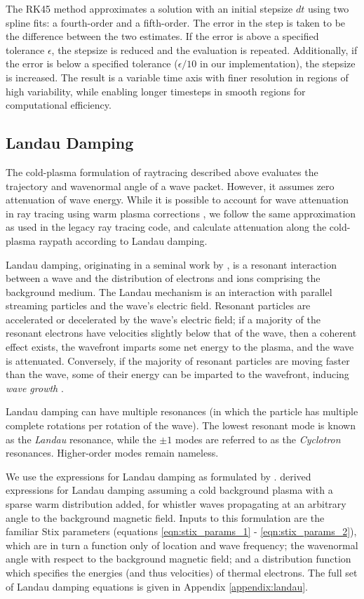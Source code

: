 The RK45 method approximates a solution with an initial stepsize $dt$ using two spline fits: a fourth-order and a fifth-order. The error in the step is taken to be the difference between the two estimates. If the error is above a specified tolerance $\epsilon$, the stepsize is reduced and the evaluation is repeated. Additionally, if the error is below a specified tolerance ($\epsilon/10$ in our implementation), the stepsize is increased. The result is a variable time axis with finer resolution in regions of high variability, while enabling longer timesteps in smooth regions for computational efficiency.

\subsection{Landau Damping}
\label{section:damping}
The cold-plasma formulation of raytracing described above evaluates the trajectory and wavenormal angle of a wave packet. However, it assumes zero attenuation of wave energy. While it is possible to account for wave attenuation in ray tracing using warm plasma corrections \citep{Sazhin1993, Henyey1980}, we follow the same approximation as used in the legacy ray tracing code, and calculate attenuation along the cold-plasma raypath according to Landau damping.

Landau damping, originating in a seminal work by \cite{Landau1946}, is a resonant interaction between a wave and the distribution of electrons and ions comprising the background medium. The Landau mechanism is an interaction with parallel streaming particles and the wave's electric field. Resonant particles are accelerated or decelerated by the wave's electric field; if a majority of the resonant electrons have velocities slightly below that of the wave, then a coherent effect exists, the wavefront imparts some net energy to the plasma, and the wave is attenuated. Conversely, if the majority of resonant particles are moving faster than the wave, some of their energy can be imparted to the wavefront, inducing \emph{wave growth} \citep{Chen1983, Kulkarni2009}. 

Landau damping can have multiple resonances (in which the particle has multiple complete rotations per rotation of the wave). The lowest resonant mode is known as the \emph{Landau} resonance, while the $\pm 1$ modes are referred to as the \emph{Cyclotron} resonances. Higher-order modes remain nameless.

We use the expressions for Landau damping as formulated by \cite{Brinca1972}. \citeauthor{Brinca1972} derived expressions for Landau damping assuming a cold background plasma with a sparse warm distribution added, for whistler waves propagating at an arbitrary angle to the background magnetic field. Inputs to this formulation are the familiar Stix parameters (equations \ref{eqn:stix_params_1} - \ref{eqn:stix_params_2}), which are in turn a function only of location and wave frequency; the wavenormal angle with respect to the background magnetic field; and a distribution function which specifies the energies (and thus velocities) of thermal electrons. The full set of Landau damping equations is given in Appendix \ref{appendix:landau}.

